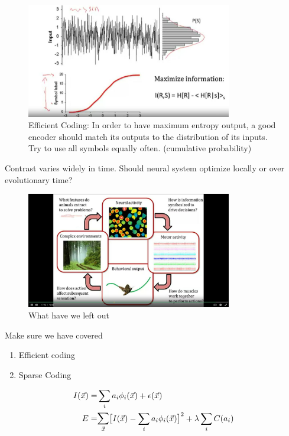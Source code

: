 \documentclass[]{article}
\begin{document}
\begin{figure}[H]
	\begin{center}
		\caption[Efficient Coding]{Efficient Coding: In order to have maximum entropy output, a good encoder should match its outputs to the distribution of its inputs. Try to use all symbols equally often. (cumulative probability)}
		\includegraphics[width=0.8\textwidth]{efficient-coding}
	\end{center}
\end{figure}

Contrast varies widely in time. Should neural system optimize locally or over evolutionary time?

\begin{figure}[H]
	\begin{center}
		\caption{What have we left out}
		\includegraphics[width=0.8\textwidth]{4-big-picture}
	\end{center}
\end{figure}

Make sure we have covered
\begin{enumerate}
	\item Efficient coding
	\item Sparse Coding
\end{enumerate}

\begin{align*}
	I(\vec{x}) =& \sum_{i}a_i \phi_i(\vec{x}) + \epsilon(\vec{x})\\
	E =& \mathlarger \sum_{\vec{x}}\big[I(\vec{x})-\sum_{i}a_i \phi_i(\vec{x})\big]^2 + \lambda \sum_{i}C(a_i)
\end{align*}
\end{document}
